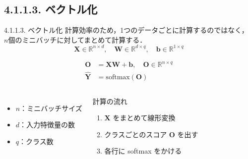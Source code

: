 \documentclass[dvipdfmx,uplatex,11pt]{beamer}
\begin{document}
\subsection{4.1.1.3. ベクトル化}
\begin{frame}{4.1.1.3. ベクトル化}
計算効率のため，1つのデータごとに計算するのではなく，
$n$個の\alert{ミニバッチ}に対してまとめて計算する．
\[
\mathbf{X} \in \mathbb{R}^{n \times d},
\quad
\mathbf{W} \in \mathbb{R}^{d \times q},
\quad
\mathbf{b} \in \mathbb{R}^{1 \times q}
\]

\[
\begin{aligned}
\mathbf{O}
&=
\mathbf{X}\mathbf{W}
+
\mathbf{b},
\quad
\mathbf{O} \in \mathbb{R}^{n \times q} \\
\hat{\mathbf{Y}}
&=
\mathrm{softmax}(\mathbf{O})
\end{aligned}
\]

\begin{columns}[T]
\begin{itemize}
  \item $n$：ミニバッチサイズ
  \item $d$：入力特徴量の数
  \item $q$：クラス数
\end{itemize}

\begin{d2lbox}{計算の流れ}
\begin{enumerate}
  \item $\mathbf{X}$ をまとめて線形変換
  \item クラスごとのスコア $\mathbf{O}$ を出す
  \item 各行に softmax をかける
\end{enumerate}
\end{d2lbox}
\end{columns}


\end{frame}
\end{document}
